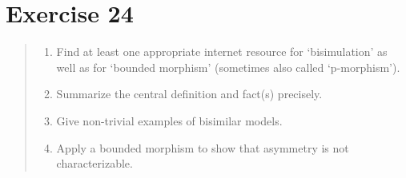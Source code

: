 \documentclass[11pt,a4paper]{article}
\begin{document}
\section*{Exercise 24}
\begin{quote}
\begin{enumerate}
\item  Find at least one appropriate internet resource for
‘bisimulation’ as well as for ‘bounded morphism’
(sometimes also called ‘p-morphism’).
\item Summarize the central definition and fact(s) precisely.
\item Give non-trivial examples of bisimilar models.
\item Apply a bounded morphism to show that asymmetry is not
characterizable.
\end{enumerate}
\end{quote}
\end{document}
